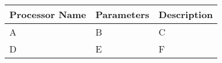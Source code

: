 \documentclass{article}
\begin{document}
\begin{tabular}{|l|l|l|}
  \hline
 Processor Name & Parameters & Description \\
  \hline
  A & B & C \\
  \hline
  D & E & F \\
  \hline
\end{tabular}
\end{document}
